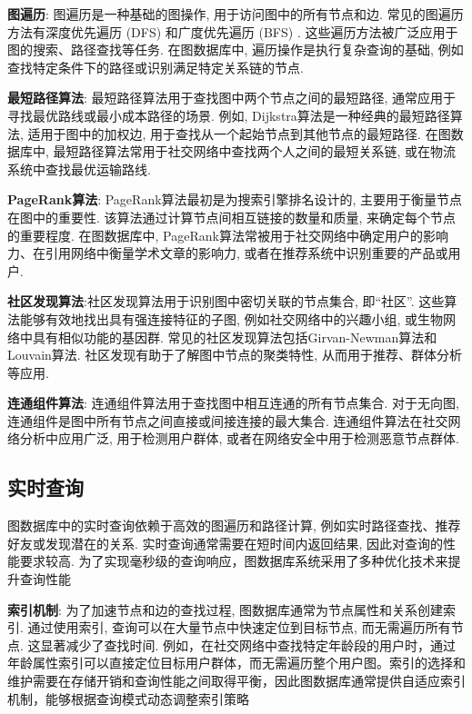 \documentclass[12pt,hyperref,a4paper,UTF8]{ctexart}
\begin{document}
\textbf{图遍历}: 图遍历是一种基础的图操作, 用于访问图中的所有节点和边. 常见的图遍历方法有深度优先遍历 (DFS) 和广度优先遍历 (BFS) . 这些遍历方法被广泛应用于图的搜索、路径查找等任务. 在图数据库中, 遍历操作是执行复杂查询的基础, 例如查找特定条件下的路径或识别满足特定关系链的节点.

\textbf{最短路径算法}: 最短路径算法用于查找图中两个节点之间的最短路径, 通常应用于寻找最优路线或最小成本路径的场景. 例如, Dijkstra算法是一种经典的最短路径算法, 适用于图中的加权边, 用于查找从一个起始节点到其他节点的最短路径. 在图数据库中, 最短路径算法常用于社交网络中查找两个人之间的最短关系链, 或在物流系统中查找最优运输路线.

\textbf{PageRank算法}: PageRank算法最初是为搜索引擎排名设计的, 主要用于衡量节点在图中的重要性. 该算法通过计算节点间相互链接的数量和质量, 来确定每个节点的重要程度. 在图数据库中, PageRank算法常被用于社交网络中确定用户的影响力、在引用网络中衡量学术文章的影响力, 或者在推荐系统中识别重要的产品或用户.

\textbf{社区发现算法}:社区发现算法用于识别图中密切关联的节点集合, 即“社区”. 这些算法能够有效地找出具有强连接特征的子图, 例如社交网络中的兴趣小组, 或生物网络中具有相似功能的基因群. 常见的社区发现算法包括Girvan-Newman算法和Louvain算法. 社区发现有助于了解图中节点的聚类特性, 从而用于推荐、群体分析等应用.

\textbf{连通组件算法}: 连通组件算法用于查找图中相互连通的所有节点集合. 对于无向图, 连通组件是图中所有节点之间直接或间接连接的最大集合. 连通组件算法在社交网络分析中应用广泛, 用于检测用户群体, 或者在网络安全中用于检测恶意节点群体.



\subsection{实时查询}

图数据库中的实时查询依赖于高效的图遍历和路径计算, 例如实时路径查找、推荐好友或发现潜在的关系. 实时查询通常需要在短时间内返回结果, 因此对查询的性能要求较高. 为了实现毫秒级的查询响应，图数据库系统采用了多种优化技术来提升查询性能

\textbf{索引机制}: 为了加速节点和边的查找过程, 图数据库通常为节点属性和关系创建索引. 通过使用索引, 查询可以在大量节点中快速定位到目标节点, 而无需遍历所有节点. 这显著减少了查找时间. 例如，在社交网络中查找特定年龄段的用户时，通过年龄属性索引可以直接定位目标用户群体，而无需遍历整个用户图。索引的选择和维护需要在存储开销和查询性能之间取得平衡，因此图数据库通常提供自适应索引机制，能够根据查询模式动态调整索引策略
\end{document}
